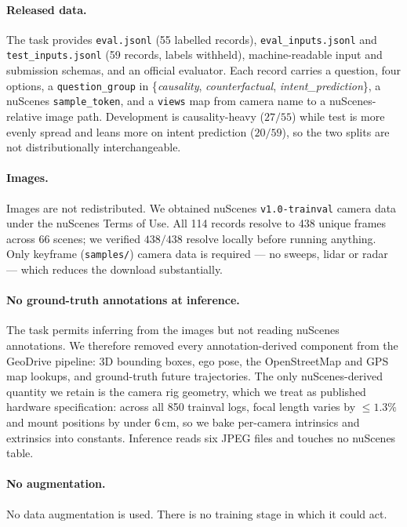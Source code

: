 \documentclass[11pt]{article}
\begin{document}
\paragraph{Released data.} The task provides \texttt{eval.jsonl} (55 labelled
records), \texttt{eval\_inputs.jsonl} and \texttt{test\_inputs.jsonl} (59
records, labels withheld), machine-readable input and submission schemas, and
an official evaluator. Each record carries a question, four options, a
\texttt{question\_group} in \{\textit{causality}, \textit{counterfactual},
\textit{intent\_prediction}\}, a nuScenes \texttt{sample\_token}, and a
\texttt{views} map from camera name to a nuScenes-relative image path.
Development is causality-heavy ($27/55$) while test is more evenly spread and
leans more on intent prediction ($20/59$), so the two splits are not
distributionally interchangeable.

\paragraph{Images.} Images are not redistributed. We obtained nuScenes
\texttt{v1.0-trainval} camera data under the nuScenes Terms of Use. All 114
records resolve to 438 unique frames across 66 scenes; we verified $438/438$
resolve locally before running anything. Only keyframe (\texttt{samples/})
camera data is required --- no sweeps, lidar or radar --- which reduces the
download substantially.

\paragraph{No ground-truth annotations at inference.} The task permits
inferring from the images but not reading nuScenes annotations. We therefore
removed every annotation-derived component from the GeoDrive pipeline:
3D bounding boxes, ego pose, the OpenStreetMap and GPS map lookups, and
ground-truth future trajectories. The only nuScenes-derived quantity we retain
is the camera rig geometry, which we treat as published hardware
specification: across all 850 trainval logs, focal length varies by
$\leq\!1.3\%$ and mount positions by under $6$\,cm, so we bake per-camera
intrinsics and extrinsics into constants. Inference reads six JPEG files and
touches no nuScenes table.

\paragraph{No augmentation.} No data augmentation is used. There is no
training stage in which it could act.
\end{document}
